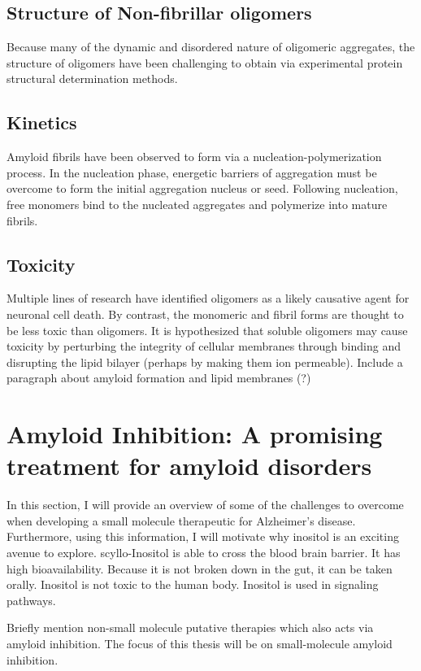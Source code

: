   \subsection{Structure of Non-fibrillar oligomers}
   Because many of the dynamic and disordered nature of oligomeric aggregates, the structure of oligomers have been challenging to obtain via experimental protein structural determination methods.
	
  \subsection{Kinetics}
  Amyloid fibrils have been observed to form via a nucleation-polymerization process. In the nucleation phase, energetic barriers of aggregation must be overcome to form the initial aggregation nucleus or seed.  Following nucleation, free monomers bind to the nucleated aggregates and polymerize into mature fibrils.\cite{Murphy:2002fe}
    
  \subsection{Toxicity}
  \begin{outline}
  	\1 Multiple lines of research have identified oligomers as a likely causative agent for neuronal cell death. By contrast, the monomeric and fibril forms are thought to be less toxic than oligomers. It is hypothesized that soluble oligomers may cause toxicity by perturbing the integrity of cellular membranes through binding and disrupting the lipid bilayer (perhaps by making them ion permeable). \cite{Walsh:2007fu}
  	\1 Include a paragraph about amyloid formation and lipid membranes (?)
  \end{outline}


\section{Amyloid Inhibition: A promising treatment for amyloid disorders}
\begin{outline}
	\1 In this section, I will provide an overview of some of the challenges to overcome when developing a small molecule therapeutic for Alzheimer's disease.  Furthermore, using this information, I will motivate why inositol is an exciting avenue to explore.
	  \2 scyllo-Inositol is able to cross the blood brain barrier. It has high bioavailability. Because it is not broken down in the gut, it can be taken orally.
	  \2 Inositol is not toxic to the human body.  Inositol is used in signaling pathways.

	\1 Briefly mention non-small molecule putative therapies which also acts via amyloid inhibition. The focus of this thesis will be on small-molecule amyloid inhibition.
\end{outline}

